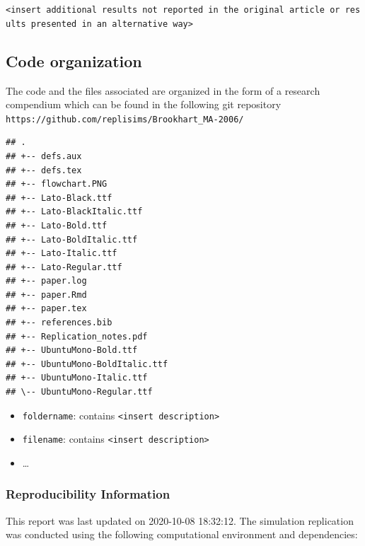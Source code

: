 \documentclass[10,a4paperpaper,]{article}
\begin{document}
\texttt{\textless{}insert\ additional\ results\ not\ reported\ in\ the\ original\ article\ or\ results\ presented\ in\ an\ alternative\ way\textgreater{}}

\subsection{Code organization}

The code and the files associated are organized in the form of a
research compendium which can be found in the following git repository
\texttt{https://github.com/replisims/Brookhart\_MA-2006/}

\begin{verbatim}
## .
## +-- defs.aux
## +-- defs.tex
## +-- flowchart.PNG
## +-- Lato-Black.ttf
## +-- Lato-BlackItalic.ttf
## +-- Lato-Bold.ttf
## +-- Lato-BoldItalic.ttf
## +-- Lato-Italic.ttf
## +-- Lato-Regular.ttf
## +-- paper.log
## +-- paper.Rmd
## +-- paper.tex
## +-- references.bib
## +-- Replication_notes.pdf
## +-- UbuntuMono-Bold.ttf
## +-- UbuntuMono-BoldItalic.ttf
## +-- UbuntuMono-Italic.ttf
## \-- UbuntuMono-Regular.ttf
\end{verbatim}

\begin{itemize}
\tightlist
\item
  \texttt{foldername}: contains
  \texttt{\textless{}insert\ description\textgreater{}}
\item
  \texttt{filename}: contains
  \texttt{\textless{}insert\ description\textgreater{}}
\item
  \ldots{}
\end{itemize}

\subsubsection*{Reproducibility Information}

This report was last updated on 2020-10-08 18:32:12. The simulation
replication was conducted using the following computational environment
and dependencies:

\FloatBarrier
\end{document}
